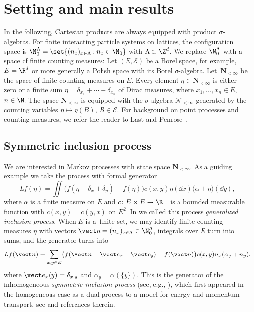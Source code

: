 \section{Setting and main results} \label{sec:setting-results}

In the following, Cartesian products are always equipped with product $\sigma$-algebras. For finite interacting particle systems on lattices, the configuration space is $\N_0^\Lambda = \set{(n_x)_{x\in \Lambda}\colon n_x \in \N_0}$ with $\Lambda\subset\Z^d$. We replace $\N_0^\Lambda$ with a space of finite counting measures:
Let $(E,\mathcal E)$ be a Borel space, for example, $E= \R^d$ or more generally a Polish space with its Borel $\sigma$-algebra. Let~$\mathbf N_{<\infty}$ be the space of finite counting measures on $E$. Every element $\eta \in \mathbf N_{<\infty}$ is either zero or a finite sum $\eta= \delta_{x_1}+\cdots + \delta_{x_n}$ of Dirac measures, where $x_1, \ldots, x_n \in E$, $n \in \N$. The space $\mathbf N_{<\infty}$ is equipped with the $\sigma$-algebra $\mathcal N_{<\infty}$ generated by the counting variables $\eta \mapsto \eta(B)$, $B\in \mathcal E$.
For background on point processes and counting measures, we refer the reader to Last and Penrose~\cite{LastPenroseLecturesOnThePoissonProcess}.

\subsection{Symmetric inclusion process}

We are interested in Markov processes with state space $\mathbf N_{<\infty}$. As a guiding example we take the process with formal generator
\begin{equation} \label{eq:gsip}
	L f(\eta) = \iint \bigl( f(\eta-\delta_x+\delta_y)- f(\eta)\bigr) c(x,y) \eta(\dd x) \bigl( \alpha+\eta\bigr) (\dd y),
\end{equation}
where $\alpha$ is a finite measure on $E$ and $c\colon E\times E\to \R_+$ is a bounded measurable function with $c(x,y) = c(y,x)$ on $E^2$. In \cite{IntertwiningConsistent} we called this process \emph{generalized inclusion process}. When $E$ is a~finite set, we may identify finite counting measures $\eta$ with vectors $\vect n = (n_x)_{x\in \Lambda}\in \N_0^\Lambda$, integrals over $E$ turn into sums, and the generator turns into
\begin{equation} \label{eq:sip}
	Lf(\vect n) = \sum_{x,y\in E} \bigl( f(\vect n- \vect e_x+\vect e_y) - f(\vect n)\bigr) c(x,y) n_x (\alpha_y+n_y),
\end{equation}
where $\vect e_x(y) = \delta_{x,y}$ and $\alpha_y = \alpha(\{y\})$. This is the generator of the inhomogeneous \emph{symmetric inclusion process} (see, e.g., \cite[equation~(2.2)]{floreani2020orthogonal}), which first appeared in the homogeneous case as a dual process to a model for energy and momentum transport, see \cite{giardina-redig-vafayi2010} and references therein.

